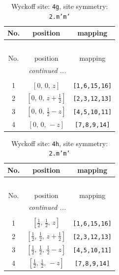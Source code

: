 \documentclass[fleqn,8pt]{jsarticle}
\begin{document}
\renewcommand{\arraystretch}{1.2}
\begin{longtable}{ccc}
\caption{Wyckoff site: {\tt 4g}, site symmetry: {\tt 2.m'm'}}
 \\
 \hline \hline
No. & position & mapping \\ \hline \endfirsthead

\multicolumn{2}{l}{\tablename\ \thetable{}} \\
 \hline \hline
No. & position & mapping \\ \hline \endhead

 \hline \hline
\multicolumn{2}{r}{\footnotesize\it continued ...} \\ \endfoot

 \hline \hline
\multicolumn{2}{r}{} \\ \endlastfoot

1 & $\left[ 0,\, 0,\, z \right]$ & {\tt [1,6,15,16]} \\ \hline
2 & $\left[ 0,\, 0,\, z + \frac{1}{2} \right]$ & {\tt [2,3,12,13]} \\ \hline
3 & $\left[ 0,\, 0,\, \frac{1}{2} - z \right]$ & {\tt [4,5,10,11]} \\ \hline
4 & $\left[ 0,\, 0,\, - z \right]$ & {\tt [7,8,9,14]} \\
\end{longtable}
\renewcommand{\arraystretch}{1.2}
\begin{longtable}{ccc}
\caption{Wyckoff site: {\tt 4h}, site symmetry: {\tt 2.m'm'}}
 \\
 \hline \hline
No. & position & mapping \\ \hline \endfirsthead

\multicolumn{2}{l}{\tablename\ \thetable{}} \\
 \hline \hline
No. & position & mapping \\ \hline \endhead

 \hline \hline
\multicolumn{2}{r}{\footnotesize\it continued ...} \\ \endfoot

 \hline \hline
\multicolumn{2}{r}{} \\ \endlastfoot

1 & $\left[ \frac{1}{2},\, \frac{1}{2},\, z \right]$ & {\tt [1,6,15,16]} \\ \hline
2 & $\left[ \frac{1}{2},\, \frac{1}{2},\, z + \frac{1}{2} \right]$ & {\tt [2,3,12,13]} \\ \hline
3 & $\left[ \frac{1}{2},\, \frac{1}{2},\, \frac{1}{2} - z \right]$ & {\tt [4,5,10,11]} \\ \hline
4 & $\left[ \frac{1}{2},\, \frac{1}{2},\, - z \right]$ & {\tt [7,8,9,14]} \\
\end{longtable}
\end{document}
